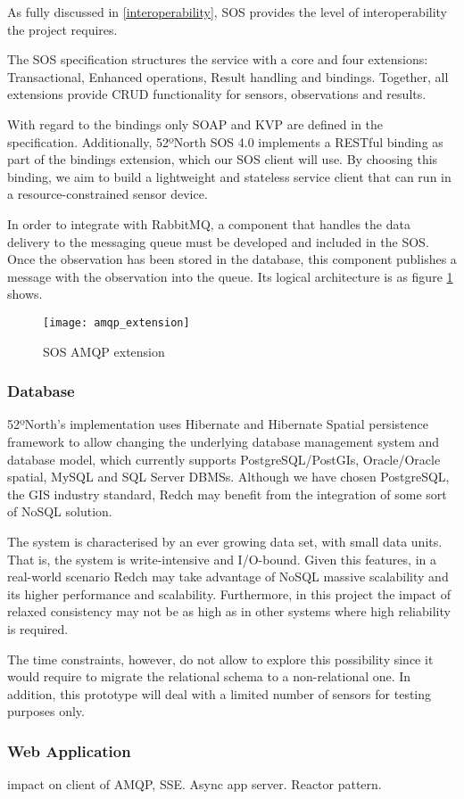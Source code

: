 As fully discussed in \ref{interoperability}, SOS provides the level of interoperability the project requires.

The SOS specification structures the service with a core and four extensions: Transactional, Enhanced operations, Result handling and bindings. Together, all extensions provide CRUD functionality for sensors, observations and results.

With regard to the bindings only SOAP and KVP are defined in the specification. Additionally, 52ºNorth SOS 4.0 implements a RESTful binding as part of the bindings extension, which our SOS client will use. By choosing this binding, we aim to build a lightweight and stateless service client that can run in a resource-constrained sensor device.

In order to integrate with RabbitMQ, a component that handles the data delivery to the messaging queue must be developed and included in the SOS. Once the observation has been stored in the database, this component publishes a message with the observation into the queue. Its logical architecture is as figure \ref{fig:amqp_extension} shows.

\begin{figure}[p]
	\centering
	\texttt{[image: amqp\_extension]}
	\caption{SOS AMQP extension}
	\label{fig:amqp_extension}
\end{figure}

\subsubsection{Database}

52ºNorth's implementation uses Hibernate and Hibernate Spatial persistence framework to allow changing the underlying database management system and database model, which currently supports PostgreSQL/PostGIs, Oracle/Oracle spatial, MySQL and SQL Server DBMSs. Although we have chosen PostgreSQL, the GIS industry standard, Redch may benefit from the integration of some sort of NoSQL solution.

The system is characterised by an ever growing data set, with small data units. That is, the system is write-intensive and I/O-bound. Given this features, in a real-world scenario Redch may take advantage of NoSQL massive scalability and its higher performance and scalability. Furthermore, in this project the impact of relaxed consistency may not be as high as in other systems where high reliability is required.

The time constraints, however, do not allow to explore this possibility since it would require to migrate the relational schema to a non-relational one. In addition, this prototype will deal with a limited number of sensors for testing purposes only.


\subsubsection{Web Application}

impact on client of AMQP, SSE. Async app server. Reactor pattern.